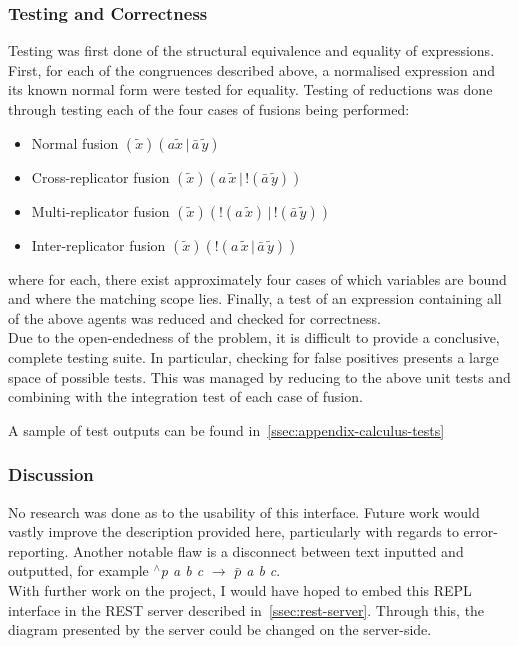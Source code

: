     \subsubsection{Testing and Correctness}\label{sssec:repl-testing}
        Testing was first done of the structural equivalence and equality of expressions.
        First, for each of the congruences described above, a normalised expression and its known normal form were tested for equality.
        Testing of reductions was done through testing each of the four cases of fusions being performed:
        \begin{itemize}
            \item Normal fusion $(\tilde{x})(a \tilde{x} \,|\, \bar{a} \, \tilde{y})$
            \item Cross-replicator fusion $(\tilde{x})(a \, \tilde{x} \,|\, !(\bar{a} \, \tilde{y}))$
            \item Multi-replicator fusion $(\tilde{x})(!(a \, \tilde{x}) \,|\, !(\bar{a} \, \tilde{y}))$
            \item Inter-replicator fusion $(\tilde{x})(!(a \, \tilde{x} \,|\, \bar{a} \, \tilde{y}))$
        \end{itemize} 
        where for each, there exist approximately four cases of which variables are bound and where the matching scope lies.
        Finally, a test of an expression containing all of the above agents was reduced and checked for correctness. \\ %

        Due to the open-endedness of the problem, it is difficult to provide a conclusive, complete testing suite.
        In particular, checking for false positives presents a large space of possible tests.
        This was managed by reducing to the above unit tests and combining with the integration test of each case of fusion.

        A sample of test outputs can be found in~\ref{ssec:appendix-calculus-tests}


    \subsubsection{Discussion}
        No research was done as to the usability of this interface.
        Future work would vastly improve the description provided here, particularly with regards to error-reporting.
        Another notable flaw is a disconnect between text inputted and outputted, for example \textit{$^{\wedge}$p a b c} $\rightarrow$ \textit{$\bar{p}$ a b c}.\\

        With further work on the project, I would have hoped to embed this REPL interface in the REST server described in~\ref{ssec:rest-server}.
        Through this, the diagram presented by the server could be changed on the server-side.
